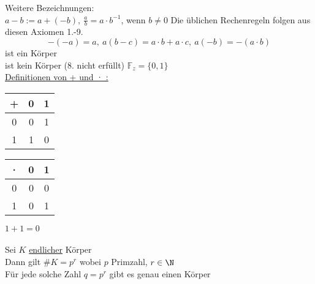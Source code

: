 Weitere Bezeichnungen:\\
$a-b:=a+(-b),\ \frac{a}{b}=a·b^{-1}$, wenn $b≠0$
\bem
Die üblichen Rechenregeln folgen aus diesen Axiomen 1.-9.
\bsp
$$-(-a)=a,\ a(b-c)=a·b+a·c,\ a(-b)=-(a·b)$$
%
\Q ist ein Körper\\
\Z ist kein Körper (8. nicht erfüllt)
%
$\mathbb{F}_z=\{0,1\}$\\
\underline{Definitionen von + und · :}\\[8pt]
\parbox{.2\textwidth}{\begin{tabular}{c|cc}
+&0&1\\[2pt]\hline
0&0&1\\[2pt]
1&1&0
\end{tabular}}
\parbox{.2\textwidth}{\begin{tabular}{c|cc}
·&0&1\\[2pt]\hline
0&0&0\\[2pt]
1&0&1
\end{tabular}}
$1+1=0$\\[4pt]
\\
\bem
Sei $K$ \underline{endlicher} Körper\\
Dann gilt $\#K=p^r$ wobei $p$ Primzahl, $r\in\N$\\
Für jede solche Zahl $q=p^r$ gibt es genau einen Körper

